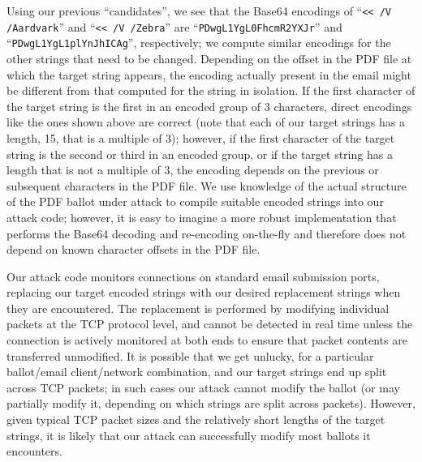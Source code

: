 \documentclass{article}
\begin{document}
Using our previous ``candidates'', we see that the Base64 encodings of
``\texttt{<{}< /V /Aardvark}'' and ``\texttt{<{}< /V
  /Zebra\textvisiblespace\textvisiblespace\textvisiblespace}'' are
``\texttt{PDwgL1YgL0FhcmR2YXJr}'' and
``\texttt{PDwgL1YgL1plYnJhICAg}'', respectively; we compute similar
encodings for the other strings that need to be changed. Depending on
the offset in the PDF file at which the target string appears, the
encoding actually present in the email might be different from that
computed for the string in isolation. If the first character of the
target string is the first in an encoded group of 3 characters, direct
encodings like the ones shown above are correct (note that each of our
target strings has a length, 15, that is a multiple of 3); however, if
the first character of the target string is the second or third in an
encoded group, or if the target string has a length that is not a
multiple of 3, the encoding depends on the previous or subsequent
characters in the PDF file. We use knowledge of the actual structure
of the PDF ballot under attack to compile suitable encoded strings
into our attack code; however, it is easy to imagine a more robust
implementation that performs the Base64 decoding and re-encoding
on-the-fly and therefore does not depend on known character offsets in
the PDF file.

Our attack code monitors connections on standard email submission
ports, replacing our target encoded strings with our desired
replacement strings when they are encountered. The replacement is
performed by modifying individual packets at the TCP protocol level,
and cannot be detected in real time unless the connection is actively
monitored at both ends to ensure that packet contents are transferred
unmodified. It is possible that we get unlucky, for a particular
ballot/email client/network combination, and our target strings end up
split across TCP packets; in such cases our attack cannot modify the
ballot (or may partially modify it, depending on which strings are
split across packets). However, given typical TCP packet sizes and the
relatively short lengths of the target strings, it is likely that our
attack can successfully modify most ballots it encounters.
\end{document}
